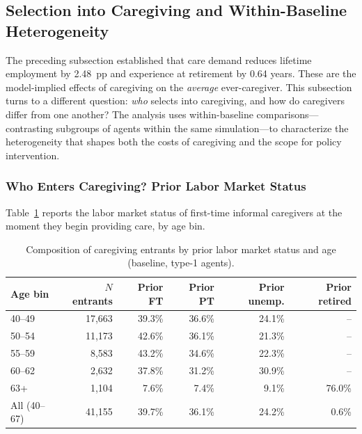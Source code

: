\subsection{Selection into Caregiving and Within-Baseline Heterogeneity}
\label{subsec:within_baseline_heterogeneity}

The preceding subsection established that care demand reduces lifetime employment by 2.48~pp and experience at retirement by 0.64 years. These are the model-implied effects of caregiving on the \textit{average} ever-caregiver. This subsection turns to a different question: \textit{who} selects into caregiving, and how do caregivers differ from one another? The analysis uses within-baseline comparisons---contrasting subgroups of agents within the same simulation---to characterize the heterogeneity that shapes both the costs of caregiving and the scope for policy intervention.

\subsubsection{Who Enters Caregiving? Prior Labor Market Status}

Table~\ref{tab:entrant_composition} reports the labor market status of first-time informal caregivers at the moment they begin providing care, by age bin.

\begin{table}[htbp]
  \centering
  \caption{Composition of caregiving entrants by prior labor market status and age (baseline, type-1 agents).}
  \label{tab:entrant_composition}
  \small
  \begin{tabular}{lrrrrr}
    \toprule
    Age bin & $N$ entrants & Prior FT & Prior PT & Prior unemp. & Prior retired \\
    \midrule
    40--49 & 17,663 & 39.3\% & 36.6\% & 24.1\% & -- \\
    50--54 & 11,173 & 42.6\% & 36.1\% & 21.3\% & -- \\
    55--59 & 8,583 & 43.2\% & 34.6\% & 22.3\% & -- \\
    60--62 & 2,632 & 37.8\% & 31.2\% & 30.9\% & -- \\
    63+ & 1,104 & 7.6\% & 7.4\% & 9.1\% & 76.0\% \\
    \addlinespace
    All (40--67) & 41,155 & 39.7\% & 36.1\% & 24.2\% & 0.6\% \\
    \bottomrule
  \end{tabular}
\end{table}

